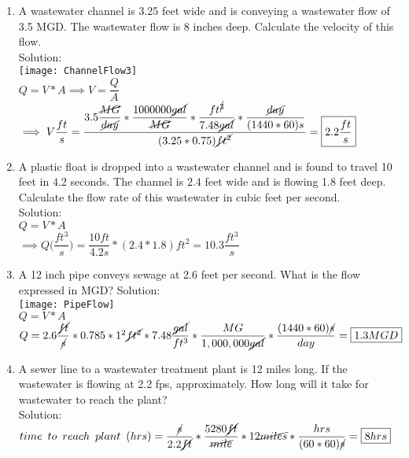 \documentclass{article}
\begin{document}
\begin{enumerate}
\item A wastewater channel is 3.25 feet wide and is conveying a wastewater flow of 3.5 MGD. The wastewater flow is 8 inches deep. Calculate the velocity of this flow.\\
Solution:\\
\texttt{[image: ChannelFlow3]}\\
$Q=V*A \implies V=\dfrac{Q}{A}$\\
$\implies V\dfrac{ft}{s}=\dfrac{3.5\dfrac{\cancel{MG}}{\cancel{day}}*\dfrac{1000000\cancel{gal}}{\cancel{MG}}*\dfrac{ft^{\cancel{3}}}{7.48\cancel{gal}}*\dfrac{\cancel{day}}{(1440*60)s}}{(3.25*0.75)\cancel{ft^2}}=\boxed{2.2\dfrac{ft}{s}}$

\item A plastic float is dropped into a wastewater channel and is found to travel 10 feet in 4.2 seconds. The channel is 2.4 feet wide and is flowing 1.8 feet deep. Calculate the flow rate of this wastewater in cubic feet per second.\\
Solution:\\
$Q=V*A$\\
$\implies Q\Big(\dfrac{ft^3}{s}\Big)=\dfrac{10ft}{4.2s}*(2.4*1.8)ft^2=\boxed{10.3\dfrac{ft^3}{s}}$
\item A 12 inch pipe conveys sewage at 2.6 feet per second.  What is the flow expressed in MGD?
Solution:\\
\texttt{[image: PipeFlow]}\\
$Q=V*A$\\
$Q=2.6\dfrac{\cancel{ft}}{\cancel{s}}*0.785*1^2\cancel{ft^2}*7.48\dfrac{\cancel{gal}}{ft^3}*\dfrac{MG}{1,000,000\cancel{gal}}*\dfrac{(1440*60)\cancel{s}}{day}=\boxed{1.3MGD}$\\

\item A sewer line to a wastewater treatment plant is 12 miles long. If the wastewater is flowing at 2.2 fps, approximately.  How long will it take for wastewater to reach the plant?\\
Solution:\\
$time \enspace to \enspace reach \enspace plant \enspace (hrs)=\dfrac{\cancel{s}}{2.2\cancel{ft}}*\dfrac{5280\cancel{ft}}{\cancel{mile}}*12\cancel{miles}*\dfrac{hrs}{(60*60)\cancel{s}}=\boxed{8hrs}$  
\end{enumerate}
\end{document}
